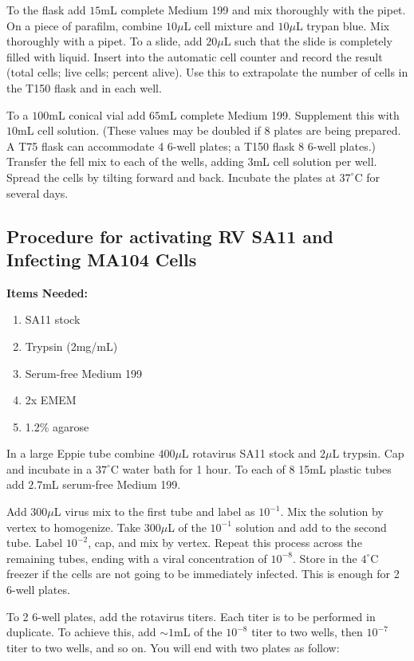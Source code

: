 To the flask add $15$mL complete Medium 199 and mix thoroughly with the pipet. On a piece of parafilm, combine $10\mu$L cell mixture and $10\mu$L trypan blue. Mix thoroughly with a pipet. To a slide, add $20\mu$L such that the slide is completely filled with liquid. Insert into the automatic cell counter and record the result (total cells; live cells; percent alive). Use this to extrapolate the number of cells in the T150 flask and in each well.

To a $100$mL conical vial add $65$mL complete Medium 199. Supplement this with $10$mL cell solution. (These values may be doubled if 8 plates are being prepared. A T75 flask can accommodate 4 6-well plates; a T150 flask 8 6-well plates.) Transfer the fell mix to each of the wells, adding $3$mL cell solution per well. Spread the cells by tilting forward and back. Incubate the plates at $37^{\circ}$C for several days.

\subsection{Procedure for activating RV SA11 and Infecting MA104 Cells}

{\bfseries Items Needed:} \begin{enumerate}
	\item SA11 stock
	\item Trypsin (2mg/mL)
	\item Serum-free Medium 199
	\item 2x EMEM
	\item 1.2\% agarose
\end{enumerate}

In a large Eppie tube combine $400\mu$L rotavirus SA11 stock and $2\mu$L trypsin. Cap and incubate in a $37^{\circ}$C water bath for 1 hour. To each of 8 15mL plastic tubes add $2.7$mL serum-free Medium 199.

Add $300\mu$L virus mix to the first tube and label as $10^{-1}$. Mix the solution by vertex to homogenize. Take $300\mu$L of the $10^{-1}$ solution and add to the second tube. Label $10^{-2}$, cap, and mix by vertex. Repeat this process across the remaining tubes, ending with a viral concentration of $10^{-8}$. Store in the $4^{\circ}$C freezer if the cells are not going to be immediately infected. This is enough for 2 6-well plates.

To 2 6-well plates, add the rotavirus titers. Each titer is to be performed in duplicate. To achieve this, add $\sim 1$mL of the $10^{-8}$ titer to two wells, then $10^{-7}$ titer to two wells, and so on. You will end with two plates as follow:

